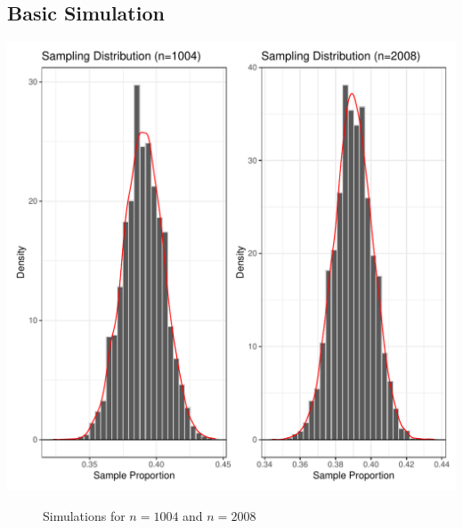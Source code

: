 \documentclass{article}\usepackage[]{graphicx}\usepackage[]{xcolor}
\makeatletter
\def\maxwidth{ %
  \ifdim\Gin@nat@width>\linewidth
    \linewidth
  \else
    \Gin@nat@width
  \fi
}
\newenvironment{knitrout}{}{} %
\makeatother
\begin{document}
\subsection{Basic Simulation}
\begin{knitrout}\scriptsize
{}\color{fgcolor}
\includegraphics[width=\maxwidth]{figure/plot1-1} 
\end{knitrout}
\begin{figure}[H]
\begin{center}

\caption{Simulations for $n=1004$ and $n=2008$}
\label{simulationplot} %
\end{center}
\end{figure}

\pagebreak
\end{document}
